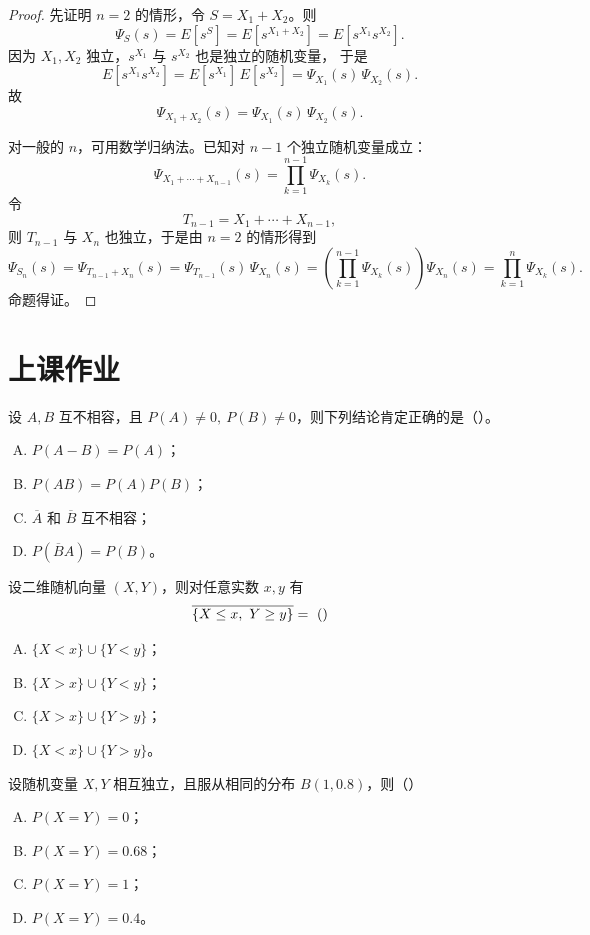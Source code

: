 \begin{proof}
先证明 $n=2$ 的情形，令 $S=X_1+X_2$。则
\[
\Psi_S(s)=E[s^S]=E[s^{X_1+X_2}]=E[s^{X_1}s^{X_2}].
\]
因为 $X_1,X_2$ 独立，$s^{X_1}$ 与 $s^{X_2}$ 也是独立的随机变量，
于是
\[
E[s^{X_1}s^{X_2}] = E[s^{X_1}]\,E[s^{X_2}]
                  = \Psi_{X_1}(s)\,\Psi_{X_2}(s).
\]
故
\[
\Psi_{X_1+X_2}(s) = \Psi_{X_1}(s)\,\Psi_{X_2}(s).
\]

对一般的 $n$，可用数学归纳法。已知对 $n-1$ 个独立随机变量成立：
\[
\Psi_{X_1+\cdots+X_{n-1}}(s)
= \prod_{k=1}^{n-1}\Psi_{X_k}(s).
\]
令
\[
T_{n-1}=X_1+\cdots+X_{n-1},
\]
则 $T_{n-1}$ 与 $X_n$ 也独立，于是由 $n=2$ 的情形得到
\[
\Psi_{S_n}(s)
= \Psi_{T_{n-1}+X_n}(s)
= \Psi_{T_{n-1}}(s)\,\Psi_{X_n}(s)
= \left(\prod_{k=1}^{n-1}\Psi_{X_k}(s)\right)\Psi_{X_n}(s)
= \prod_{k=1}^{n}\Psi_{X_k}(s).
\]
命题得证。
\end{proof}
\section{上课作业}
\begin{homework}[1]
设 $A,B$ 互不相容，且 $P(A)\ne0,\ P(B)\ne0$，则下列结论肯定正确的是（\hfill）。

\begin{enumerate}[(A)]
  \item $P(A-B)=P(A)$；
  \item $P(AB)=P(A)P(B)$；
  \item $\overline{A}$ 和 $\overline{B}$ 互不相容；
  \item $P(\overline{B}A)=P(B)$。
\end{enumerate}
\end{homework}

\begin{homework}[2]
设二维随机向量 $(X,Y)$，则对任意实数 $x,y$ 有
\[
\overline{\{X\le x,\ Y\ge y\}} =\ (\hfill)
\]

\begin{enumerate}[(A)]
  \item $\{X<x\}\cup\{Y<y\}$；
  \item $\{X>x\}\cup\{Y<y\}$；
  \item $\{X>x\}\cup\{Y>y\}$；
  \item $\{X<x\}\cup\{Y>y\}$。
\end{enumerate}
\end{homework}

\begin{homework}[3]
设随机变量 $X,Y$ 相互独立，且服从相同的分布 $B(1,0.8)$，则（\hfill）

\begin{enumerate}[(A)]
  \item $P(X=Y)=0$；
  \item $P(X=Y)=0.68$；
  \item $P(X=Y)=1$；
  \item $P(X=Y)=0.4$。
\end{enumerate}
\end{homework}

